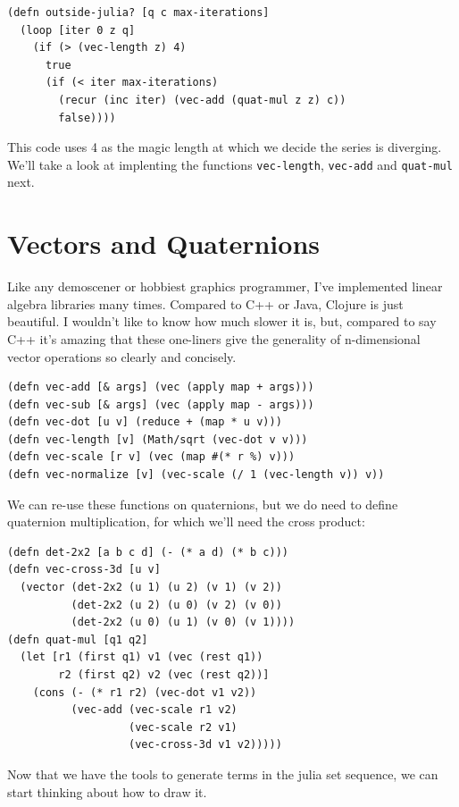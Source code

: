 \documentclass[11pt]{article}
\begin{document}
\begin{lstlisting}
(defn outside-julia? [q c max-iterations]
  (loop [iter 0 z q]
    (if (> (vec-length z) 4)
      true
      (if (< iter max-iterations)
        (recur (inc iter) (vec-add (quat-mul z z) c))
        false))))
\end{lstlisting}

This code uses 4 as the magic length at which we decide the series is diverging. We'll take a look at implenting the functions \texttt{vec-length}, \texttt{vec-add} and \texttt{quat-mul} next.

\section{Vectors and Quaternions}

Like any demoscener or hobbiest graphics programmer, I've implemented linear algebra libraries many times. Compared to C++ or Java, Clojure is just beautiful. I wouldn't like to know how much slower it is, but, compared to say C++ it's amazing that these one-liners give the generality of n-dimensional vector operations so clearly and concisely.

\begin{lstlisting}
(defn vec-add [& args] (vec (apply map + args)))
(defn vec-sub [& args] (vec (apply map - args)))
(defn vec-dot [u v] (reduce + (map * u v)))
(defn vec-length [v] (Math/sqrt (vec-dot v v)))
(defn vec-scale [r v] (vec (map #(* r %) v)))
(defn vec-normalize [v] (vec-scale (/ 1 (vec-length v)) v))
\end{lstlisting}

We can re-use these functions on quaternions, but we do need to define quaternion multiplication, for which we'll need the cross product:

\begin{lstlisting}
(defn det-2x2 [a b c d] (- (* a d) (* b c)))
(defn vec-cross-3d [u v]
  (vector (det-2x2 (u 1) (u 2) (v 1) (v 2))
          (det-2x2 (u 2) (u 0) (v 2) (v 0))
          (det-2x2 (u 0) (u 1) (v 0) (v 1))))
(defn quat-mul [q1 q2]
  (let [r1 (first q1) v1 (vec (rest q1))
        r2 (first q2) v2 (vec (rest q2))]
    (cons (- (* r1 r2) (vec-dot v1 v2))
          (vec-add (vec-scale r1 v2)
                   (vec-scale r2 v1)
                   (vec-cross-3d v1 v2)))))
\end{lstlisting}

Now that we have the tools to generate terms in the julia set sequence, we can start thinking about how to draw it.
\end{document}

